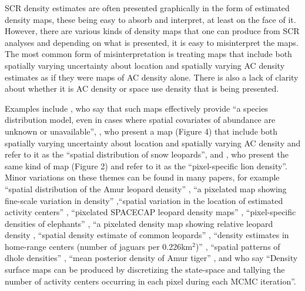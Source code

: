 \documentclass[useAMS,usenatbib,referee]{biom}
\begin{document}
SCR density estimates are often presented graphically in the form of estimated density maps, these being easy to absorb and interpret, at least on the face of it.  However, there are various kinds of density maps that one can produce from SCR analyses and depending on what is presented, it is easy to misinterpret the maps. The most common form of misinterpretation is treating maps that include both spatially varying uncertainty about location and spatially varying AC density estimates as if they were maps of AC density alone. There is also a lack of clarity about whether it is AC density or space use density that is being presented.


Examples include \cite{Dorazio+Karanth:17}, who say that such maps effectively provide  ``a species distribution model, even in cases where spatial covariates of abundance are unknown or unavailable'', \cite{Alexander+al:15}, who present a map (Figure 4) that include both spatially varying uncertainty about location and spatially varying AC density and refer to it as the ``spatial distribution of snow leopards'', and \cite{Elliot+Gopalaswamy:16}, who present the same kind of map (Figure 2) and refer to it as the ``pixel-specific lion density''. Minor variations on these themes can be found in many papers, for example ``spatial distribution of the Amur leopard density'' \citep{Qi2015}, ``a pixelated map showing fine-scale variation in density'' \citep{Fouche2020},``spatial variation in the location of estimated activity centers'' \citep{Blanc2013}, ``pixelated SPACECAP leopard density maps'' \citep{Devens2021}, ``pixel-specific densities of elephants'' \citep{Goswami2019}, ``a pixelated density map showing relative leopard density \citep{Kandel2020}, ``spatial density estimate of common leopards'' \citep{Goldberg2015}, ``density estimates in home-range centers (number of jaguars per 0.226km$^2$)'' \citep{Lavariega2020}, ``spatial patterns of dhole densities'' \citep{Srivathsa2021}, ``mean posterior density of Amur tiger'' \citep{Xiao2016}, and \cite{Chandler+Royle:13} who say ``Density surface maps can be produced by discretizing the state-space and tallying the number of activity centers occurring in each pixel during each MCMC iteration''.
\end{document}
